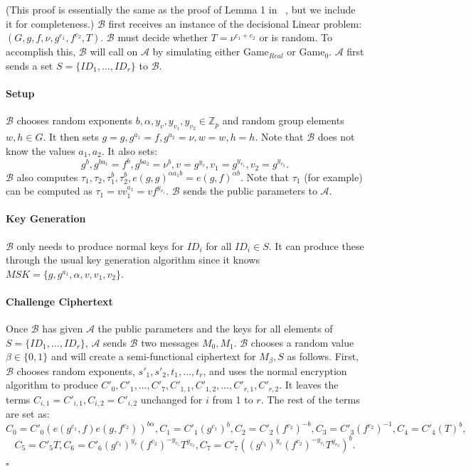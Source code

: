 \documentclass[a4paper, 11pt]{article}
\newenvironment{proof}{\par\noindent{\bf Proof.}}{$\square$\par\bigskip}
\newcommand{\Z}{\ensuremath{\mathbb{Z}}}
\theoremstyle{definition}
\begin{document}
\begin{proof} (This proof is essentially the same as the proof of Lemma 1 in ~\cite{W09}, but we include it for completeness.) $\mathcal{B}$ first receives an instance of the decisional Linear problem: $(G, g, f , \nu, g^{c_1}, f^{c_2}, T)$. $\mathcal{B}$ must decide whether $T = \nu^{c_1+c_2}$ or is random. To accomplish this, $\mathcal{B}$ will call on $\mathcal{A}$ by simulating either Game$_{Real}$ or Game$_{0}$. $\mathcal{A}$ first sends a set $S = \{ID_1, \ldots, ID_r\}$ to $\mathcal{B}$.

\paragraph{Setup} $\mathcal{B}$ chooses random exponents $b, \alpha, y_v, y_{v_1}, y_{v_2} \in \Z_p$ and random group elements $w, h \in G$. It then sets $g = g, g^{a_1} = f, g^{a_2} = \nu, w= w, h=h$. Note that $\mathcal{B}$ does not know the values $a_1, a_2$. It also sets:
\[g^b, g^{ba_1} = f^b, g^{b a_2 } = \nu^b, v = g^{y_v}, v_1 = g^{y_{v_1}}, v_2 = g^{y_{v_2}}.\]
$\mathcal{B}$ also computes $\tau_1, \tau_2, \tau_1^b, \tau_2^b, e(g,g)^{\alpha a_1 b} = e(g,f)^{\alpha b}$. Note that $\tau_1$ (for example) can be computed as $\tau_1 = v v_1^{a_1} = v f^{y_{v_1}}$. $\mathcal{B}$ sends the public parameters to $\mathcal{A}$.

\paragraph{Key Generation} $\mathcal{B}$ only needs to produce normal keys for $ID_i$ for all $ID_i \in S$. It can produce these through the usual key generation algorithm since it knows $MSK = \{g, g^{a_1}, \alpha, v, v_1, v_2\}$.

\paragraph{Challenge Ciphertext} Once $\mathcal{B}$ has given $\mathcal{A}$ the public parameters and the keys for all elements of $S = \{ID_1, \ldots, ID_r\}$, $\mathcal{A}$ sends $\mathcal{B}$ two messages $M_0, M_1$. $\mathcal{B}$ chooses a random value $\beta \in \{0,1\}$ and will create a semi-functional ciphertext for $M_\beta, S$ as follows. First, $\mathcal{B}$ chooses random exponents, $s'_1, s'_2, t_1, \ldots, t_r$, and uses the normal encryption algorithm to produce $C'_0, C'_1, \ldots, C'_7, C'_{1,1}, C'_{1,2}, \ldots, C'_{r,1}, C'_{r,2}$. It leaves the terms $C_{i,1} = C'_{i,1}, C_{i,2} = C'_{i,2}$ unchanged for $i$ from 1 to $r$. The rest of the terms are set as:
\[C_0 = C'_0 \left(e(g^{c_1},f)e(g,f^{c_2})\right)^{b\alpha}, C_1 = C'_1(g^{c_1})^b, C_2 = C'_2 (f^{c_2})^{-b}, C_3 = C'_3(f^{c_2})^{-1}, C_4 = C'_4 (T)^b,\]
\[C_5 = C'_5T, C_6 = C'_6(g^{c_1})^{y_v}(f^{c_2})^{-y_{v_1}} T^{y_{v_2}}, C_7 = C'_7 \left((g^{c_1})^{y_v}(f^{c_2})^{-y_{v_1}} T^{y_{v_2}}\right)^{b}.\]


\end{proof}
\end{document}
